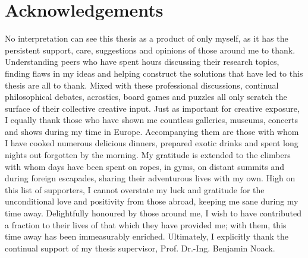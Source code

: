 \documentclass[oneside]{scrbook}
\theoremstyle{definition}
\theoremstyle{definition}
\theoremstyle{remark}
\begin{document}
\frontmatter
\tableofcontents

% 
%                                     
%                                     
%                                     
% 

\chapter{Acknowledgements}
No interpretation can see this thesis as a product of only myself, as it has the persistent support, care, suggestions and opinions of those around me to thank. Understanding peers who have spent hours discussing their research topics, finding flaws in my ideas and helping construct the solutions that have led to this thesis are all to thank. Mixed with these professional discussions, continual philosophical debates, acrostics, board games and puzzles all only scratch the surface of their collective creative input. Just as important for creative exposure, I equally thank those who have shown me countless galleries, museums, concerts and shows during my time in Europe. Accompanying them are those with whom I have cooked numerous delicious dinners, prepared exotic drinks and spent long nights out forgotten by the morning. My gratitude is extended to the climbers with whom days have been spent on ropes, in gyms, on distant summits and during foreign escapades, sharing their adventurous lives with my own. High on this list of supporters, I cannot overstate my luck and gratitude for the unconditional love and positivity from those abroad, keeping me sane during my time away. Delightfully honoured by those around me, I wish to have contributed a fraction to their lives of that which they have provided me; with them, this time away has been immeasurably enriched. Ultimately, I explicitly thank the continual support of my thesis supervisor, Prof. Dr.-Ing. Benjamin Noack.

% 
%                                                                
%                                                                
%                                                                
% 
\end{document}
